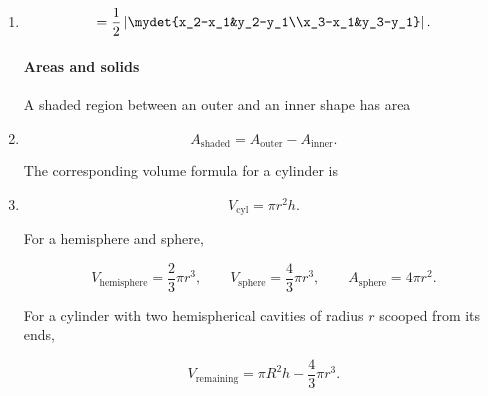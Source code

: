 \begin{enumerate}[label=\theenumi,leftmargin=4mm,itemsep=4pt]
\begin{equation}
P(A\cup B)=P(A)+P(B)-P(A\cap B),\qquad P(A^c)=1-P(A).
\label{eq:prob-union}
\end{equation}

\paragraph*{Coordinate geometry as linear algebra}
The triangle area is half the absolute determinant:

\setcounter{enumi}{28}\item

\begin{equation}
[ABC]=\frac12\left|\mydet{x_2-x_1&y_2-y_1\\x_3-x_1&y_3-y_1}\right|.
\label{eq:triangle-det}
\end{equation}

\paragraph*{Areas and solids}
A shaded region between an outer and an inner shape has area
\setcounter{enumi}{29}\item

\begin{equation}
A_{\mathrm{shaded}}=A_{\mathrm{outer}}-A_{\mathrm{inner}}.\label{eq:shaded-area}
\end{equation}

The corresponding volume formula for a cylinder is

\setcounter{enumi}{30}\item

\begin{equation}
V_{\mathrm{cyl}}=\pi r^2h.
\label{eq:cylinder-formula}
\end{equation}

For a hemisphere and sphere,


\begin{equation}
V_{\mathrm{hemisphere}}=\frac23\pi r^3,\qquad V_{\mathrm{sphere}}=\frac43\pi r^3,
\qquad A_{\mathrm{sphere}}=4\pi r^2.
\label{eq:sphere-formula}
\end{equation}

For a cylinder with two hemispherical cavities of radius $r$ scooped from its ends,



\begin{equation}
V_{\mathrm{remaining}}=\pi R^2h-\frac43\pi r^3.
\label{eq:scooped-cylinder}
\end{equation}
\end{enumerate}
